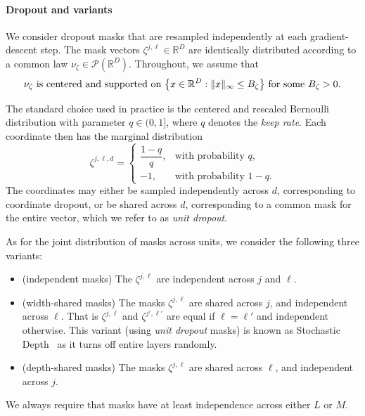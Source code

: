 \documentclass[a4paper,11pt]{article}
\newcommand{\1}{\mathbbm{1}}
\theoremstyle{definition}
\theoremstyle{remark}
\begin{document}
\paragraph{Dropout and variants}
We consider dropout masks that are resampled independently at each gradient-descent step. The mask vectors \(\zeta^{j,\ell} \in \mathbb{R}^D\) are identically distributed according to a common law \(\nu_\zeta \in \mathcal{P}(\mathbb{R}^D)\). Throughout, we assume that 
\begin{equation}\label{ass:dropout-distribution}
\text{
\(\nu_\zeta\) is centered and supported on
\(
\left\{x \in \mathbb{R}^D : \lVert x \rVert_\infty \leq B_\zeta\right\}
\)
for some \(B_\zeta > 0\).
}
\end{equation}

The standard choice used in practice is the centered and rescaled Bernoulli distribution with parameter \(q \in (0,1]\), where \(q\) denotes the \emph{keep rate}. Each coordinate then has the marginal distribution
\begin{equation}\label{eq:bernoulli_distrib}
  \zeta^{j,\ell,d}
  =
  \begin{cases}
    \dfrac{1-q}{q}, & \text{with probability } q,\\[4pt]
    -1, & \text{with probability } 1-q.
  \end{cases}
\end{equation}
The coordinates may either be sampled independently across \(d\), corresponding to coordinate dropout, or be shared across \(d\), corresponding to a common mask for the entire vector, which we refer to as \emph{unit dropout}.

As for the joint distribution of masks across units, we consider the following three variants:
\begin{itemize}
\item (independent masks) The $\zeta^{j,\ell}$ are independent across $j$ and $\ell$. 
\item (width-shared masks) The masks $\zeta^{j,\ell}$ are shared across $j$, and independent across $\ell$. That is $\zeta^{j,\ell}$ and $ \zeta^{j',\ell'}$ are equal if $\ell=\ell'$ and independent otherwise. This variant {(using \emph{unit dropout} masks)} is known as Stochastic Depth~\cite{huang2016deepnetworksstochasticdepth} as it turns off entire layers randomly.
\item (depth-shared masks)  The masks $\zeta^{j,\ell}$ are shared across $\ell$, and independent across $j$.
\end{itemize}
We always require that masks have at least independence across  either $L$ or $M$.
\end{document}
